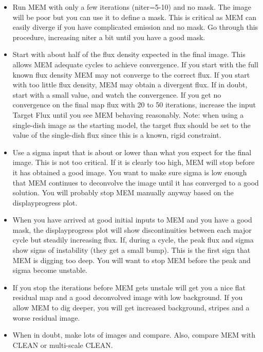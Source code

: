 \begin{itemize}

   \item Run MEM with only a few iterations (niter=5-10) and no
         mask. The image will be poor but you can use it to define a
         mask. This is critical as MEM can easily diverge if you have
         complicated emission and no mask. Go through this procedure,
         increasing niter a bit until you have a good mask.

   \item Start with about half of the flux density expected in the
         final image. This allows MEM adequate cycles to achieve
         convergence. If you start with the full known flux density
         MEM may not converge to the correct flux. If you start with
         too little flux density, MEM may obtain a divergent flux. If
         in doubt, start with a small value, and watch the
         convergence. If you get no convergence on the final map flux
         with 20 to 50 iterations, increase the input Target Flux
         until you see MEM behaving reasonably. Note: when using a
         single-dish image as the starting model, the target flux
         should be set to the value of the single-dish flux since this
         is a known, rigid constraint.

   \item Use a sigma input that is about or lower than what you expect
         for the final image. This is not too critical. If it is
         clearly too high, MEM will stop before it has obtained a good
         image. You want to make sure sigma is low enough that MEM
         continues to deconvolve the image until it has converged to a
         good solution. You will probably stop MEM manually anyway
         based on the displayprogress plot.

   \item When you have arrived at good initial inputs to MEM and you
         have a good mask, the displayprogress plot will show
         discontinuities between each major cycle but steadily
         increasing flux.  If, during a cycle, the peak flux and sigma
         show signs of instability (they get a small bump). This is
         the first sign that MEM is digging too deep.  You will want
         to stop MEM before the peak and sigma become unstable.

   \item If you stop the iterations before MEM gets unstale will get
         you a nice flat residual map and a good deconvolved image
         with low background. If you allow MEM to dig deeper, you will
         get increased background, stripes and a worse residual image.

   \item When in doubt, make lots of images and compare. Also, compare
         MEM with CLEAN or multi-scale CLEAN.
\end{itemize}


